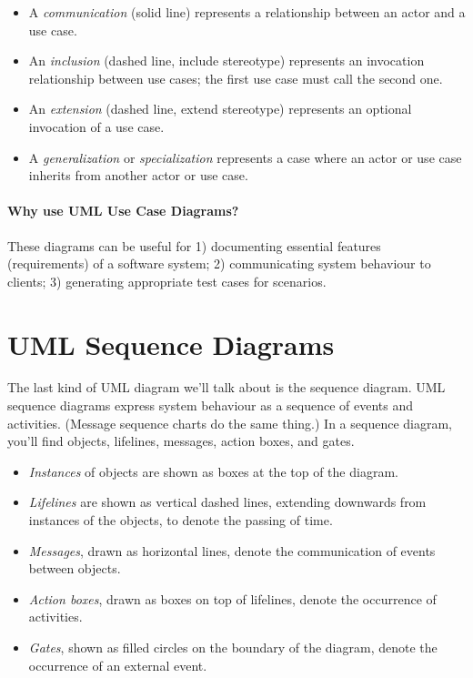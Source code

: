 \begin{itemize}
\item A \emph{communication} (solid line) represents a relationship
between an actor and a use case.
\item An \emph{inclusion} (dashed line, \guillemotleft include \guillemotright stereotype)
represents an invocation relationship between use cases; the first use 
case must call the second one.
\item An \emph{extension} (dashed line, \guillemotleft extend \guillemotright stereotype)
represents an optional invocation of a use case.
\item A \emph{generalization} or \emph{specialization} represents
a case where an actor or use case inherits from another actor or use case.
\end{itemize}

\paragraph{Why use UML Use Case Diagrams?} These diagrams can be
useful for 1) documenting essential features (requirements) of
a software system; 2) communicating system behaviour to clients; 3)
generating appropriate test cases for scenarios.

\section*{UML Sequence Diagrams}
The last kind of UML diagram we'll talk about is the sequence
diagram. UML sequence diagrams express system behaviour as a sequence
of events and activities. (Message sequence charts do the same thing.)
In a sequence diagram, you'll find objects, lifelines, messages,
action boxes, and gates.

\begin{itemize}
\item \emph{Instances} of objects are shown as boxes at the top of the diagram.
\item \emph{Lifelines} are shown as vertical dashed lines, extending
downwards from instances of the objects, to denote the passing of time.
\item \emph{Messages}, drawn as horizontal lines, denote the
communication of events between objects.
\item \emph{Action boxes}, drawn as boxes on top of lifelines, denote
the occurrence of activities.
\item \emph{Gates}, shown as filled circles on the boundary of the diagram,
denote the occurrence of an external event.
\end{itemize}

